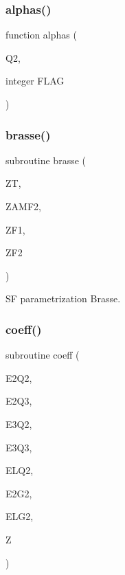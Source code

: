 \subsubsection{\texorpdfstring{alphas()}{alphas()}}
{\footnotesize\ttfamily function alphas (\begin{DoxyParamCaption}\item[{}]{Q2,  }\item[{integer}]{F\+L\+AG }\end{DoxyParamCaption})}

\mbox{\label{djangoh__h_8f_a82cd345d495397e5870ba03c6ff3662c}} 
\subsubsection{\texorpdfstring{brasse()}{brasse()}}
{\footnotesize\ttfamily subroutine brasse (\begin{DoxyParamCaption}\item[{}]{ZT,  }\item[{}]{Z\+A\+M\+F2,  }\item[{}]{Z\+F1,  }\item[{}]{Z\+F2 }\end{DoxyParamCaption})}



SF parametrization Brasse. 

\mbox{\label{djangoh__h_8f_a0f48ba14b638dc9f3dbffb7f5b8bca0b}} 
\subsubsection{\texorpdfstring{coeff()}{coeff()}}
{\footnotesize\ttfamily subroutine coeff (\begin{DoxyParamCaption}\item[{}]{E2\+Q2,  }\item[{}]{E2\+Q3,  }\item[{}]{E3\+Q2,  }\item[{}]{E3\+Q3,  }\item[{}]{E\+L\+Q2,  }\item[{}]{E2\+G2,  }\item[{}]{E\+L\+G2,  }\item[{}]{Z }\end{DoxyParamCaption})}



